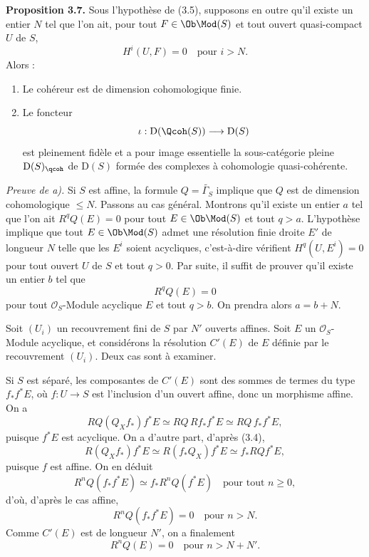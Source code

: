 \documentclass[11pt]{article}
\begin{document}
\textbf{Proposition 3.7.} Sous l'hypothèse de (3.5), supposons en outre qu'il existe un entier $N$ tel que l'on ait, pour tout $F\in\Ob\Mod(S)$ et tout ouvert quasi-compact $U$ de $S$,
\[
 H^i(U,F)=0\quad\text{pour }i>N.
\]
Alors :
\begin{enumerate}[label=\alph*)]
\item Le cohéreur est de dimension cohomologique finie.
\item Le foncteur
\[
 \iota:\mathrm D(\Qcoh(S))\longrightarrow \mathrm D(S)
\]
est pleinement fidèle et a pour image essentielle la sous-catégorie pleine $\mathrm D(S)_{\qcoh}$ de $\mathrm D(S)$ formée des complexes à cohomologie quasi-cohérente.
\end{enumerate}

\emph{Preuve de a).} Si $S$ est affine, la formule $Q=\widetilde{\Gamma_S}$ implique que $Q$ est de dimension cohomologique $\leq N$. Passons au cas général. Montrons qu'il existe un entier $a$ tel que l'on ait $R^qQ(E)=0$ pour tout $E\in\Ob\Mod(S)$ et tout $q>a$. L'hypothèse implique que tout $E\in\Ob\Mod(S)$ admet une résolution finie droite $E'$ de longueur $N$ telle que les $E^i$ soient acycliques, c'est-à-dire vérifient $H^q(U,E^i)=0$ pour tout ouvert $U$ de $S$ et tout $q>0$. Par suite, il suffit de prouver qu'il existe un entier $b$ tel que
\[
 R^qQ(E)=0
\]
pour tout $\mathcal O_S$-Module acyclique $E$ et tout $q>b$. On prendra alors $a=b+N$.

Soit $(U_i)$ un recouvrement fini de $S$ par $N'$ ouverts affines. Soit $E$ un $\mathcal O_S$-Module acyclique, et considérons la résolution $C'(E)$ de $E$ définie par le recouvrement $(U_i)$. Deux cas sont à examiner.

Si $S$ est séparé, les composantes de $C'(E)$ sont des sommes de termes du type $f_*f^*E$, où $f:U\to S$ est l'inclusion d'un ouvert affine, donc un morphisme affine. On a
\[
 RQ(Q_Xf_*)f^*E\simeq RQ\,Rf_*f^*E\simeq RQ\,f_*f^*E,
\]
puisque $f^*E$ est acyclique. On a d'autre part, d'après (3.4),
\[
 R(Q_Xf_*)f^*E\simeq R(f_*Q_X)f^*E\simeq f_*RQf^*E,
\]
puisque $f$ est affine. On en déduit
\[
 R^nQ(f_*f^*E)\simeq f_*R^nQ(f^*E)
\quad\text{pour tout }n\geq0,
\]
d'où, d'après le cas affine,
\[
 R^nQ(f_*f^*E)=0\quad\text{pour }n>N.
\]
Comme $C'(E)$ est de longueur $N'$, on a finalement
\[
 R^nQ(E)=0\quad\text{pour }n>N+N'.
\]
\end{document}
